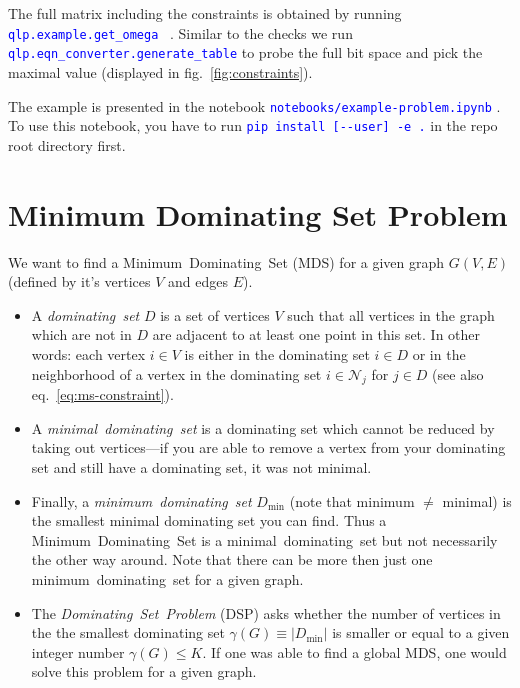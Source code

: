 \documentclass[]{article}
\newcommand{\codeword}[1]{\texttt{\textcolor{blue}{\lstinline{#1}}}
}
\begin{document}
The full matrix including the constraints is obtained by running \codeword{qlp.example.get_omega}~.
Similar to the checks we run \codeword{qlp.eqn_converter.generate_table} to probe the full bit space and pick the maximal value (displayed in fig.~\ref{fig:constraints}).

The example is presented in the notebook \codeword{notebooks/example-problem.ipynb}.
To use this notebook, you have to run \codeword{pip install [--user] -e .} in the repo root directory first.

\section{Minimum Dominating Set Problem}
We want to find a Minimum~Dominating~Set (MDS) for a given graph $G(V,E)$ (defined by it's vertices $V$ and edges $E$).

\begin{itemize}
\item A \textit{dominating~set} $D$ is a set of vertices $V$ such that all vertices in the graph which are not in $D$ are adjacent to at least one point in this set.
In other words: each vertex $i \in V$ is either in the dominating set $i \in D$ or in the neighborhood of a vertex in the dominating set $i \in \mathcal N_j$ for $j \in D$ (see also eq.~\eqref{eq:ms-constraint}).

\item A \textit{minimal~dominating~set} is a dominating set which cannot be reduced by taking out vertices---if you are able to remove a vertex from your dominating set and still have a dominating set, it was not minimal.

\item Finally, a \textit{minimum~dominating~set} $D_\text{min}$ (note that minimum $\neq$  minimal) is the smallest minimal dominating set you can find.
Thus a Minimum~Dominating~Set is a minimal~dominating~set but not necessarily the other way around.
Note that there can be more then just one minimum~dominating~set for a given graph.

\item The \textit{Dominating~Set~Problem} (DSP) asks whether the number of vertices in the the smallest dominating set $\gamma(G) \equiv |D_\text{min}|$ is smaller or equal to a given integer number $\gamma(G) \leq K$.
If one was able to find a global MDS, one would solve this problem for a given graph.
\end{itemize}
\end{document}
